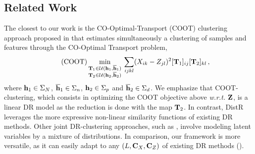 \subsection{Related Work}\label{sec:related_work}

The closest to our work is the CO-Optimal-Transport (COOT) clustering approach proposed in \cite{redko2020co} that estimates simultaneously a clustering of samples and features through the CO-Optimal Transport problem,
\begin{align}\tag{COOT}
	\label{eq:coot_pb}
	\min_{\substack{{\mathbf{T}}_1 \in {\mathcal{U}}({\mathbf{h}}_1, \overline{{\mathbf{h}}}_1) \\ {\mathbf{T}}_2 \in {\mathcal{U}}({\mathbf{h}}_2, \overline{{\mathbf{h}}}_2)}} \: \sum_{ijkl} (X_{ik} - Z_{jl})^2 [{\mathbf{T}}_1]_{ij} [{\mathbf{T}}_2]_{kl} \,,
\end{align}
where ${\mathbf{h}}_1 \in \Sigma_N$, $\overline{{\mathbf{h}}}_1 \in \Sigma_n$, ${\mathbf{h}}_2 \in \Sigma_p$ and $\overline{{\mathbf{h}}}_2 \in \Sigma_d$.
We emphasize that COOT-clustering, which consists in optimizing the COOT objective
above \emph{w.r.t.} ${\mathbf{Z}}$, is a linear DR model as the reduction is done with the map ${\mathbf{T}}_2$. In contrast, DistR
leverages the more expressive non-linear similarity functions of existing DR
methods. Other joint DR-clustering approaches, such as \cite{liu2022joint},
involve modeling latent variables by a mixture of distributions. In comparison,
our framework is more versatile, as it can easily adapt to any $(L, {\mathbf{C}}_X,
{\mathbf{C}}_Z)$ of existing DR methods ().
